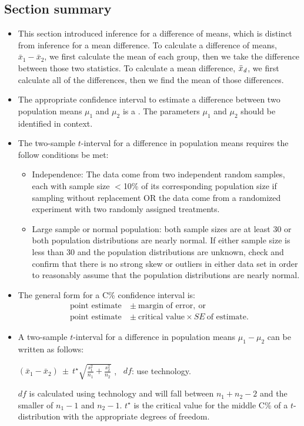 \subsection*{Section summary}
\begin{itemize} 
\item This section introduced inference for a difference of means, which is distinct from inference for a mean difference.  To calculate a difference of means, $\bar{x}_1-\bar{x}_2$, we first calculate the mean of each group, then we take the difference between those two statistics.  To calculate a mean difference, $\bar{x}_{\text{\emph{d}}}$, we first calculate all of the differences, then we find the mean of those differences.

\item The appropriate confidence interval to estimate a difference between two population means $\mu_1$ and $\mu_2$ is a .  The parameters $\mu_1$ and $\mu_2$ should be identified in context.

\item The two-sample $t$-interval for a difference in population means requires the follow conditions be met:  
\begin{itemize}
\item[1.] Independence:  The data come from two independent random samples, each with sample size $<$10\% of its corresponding population size if sampling without replacement OR the data come from a randomized experiment with two randomly assigned treatments.
\item[2.] Large sample or normal population: both sample sizes are at least 30 or both population distributions are nearly normal. If either sample size is less than 30 and the population distributions are unknown, check and confirm that there is no strong skew or outliers in either data set in order to reasonably assume that the population distributions are nearly normal.
\end{itemize}

\item The general form for a C\% confidence interval is: 
\begin{align*}
\text{point estimate}\ &\pm\ \text{margin of error}, \ \text{or}\\
\text{point estimate}\ &\pm\ \text{critical value} \times SE\ \text{of estimate}.
\end{align*}
\item A two-sample $t$-interval for a difference in population means $\mu_1-\mu_2$ can be written as follows:
\begin{center}
$(\bar{x}_1-\bar{x}_2) \ \pm\  t^{\star} \sqrt{\frac{s^2_1}{n_1}+\frac{s^2_2}{n_2}}$ , \ $df$: use technology.
\end{center}
$df$ is calculated using technology and will fall between $n_1+n_2-2$ and the smaller of $n_1-1$ and $n_2-1$. $t^{\star}$ is the critical value for the middle C\% of a $t$-distribution with the appropriate degrees of freedom. 



\end{itemize}
